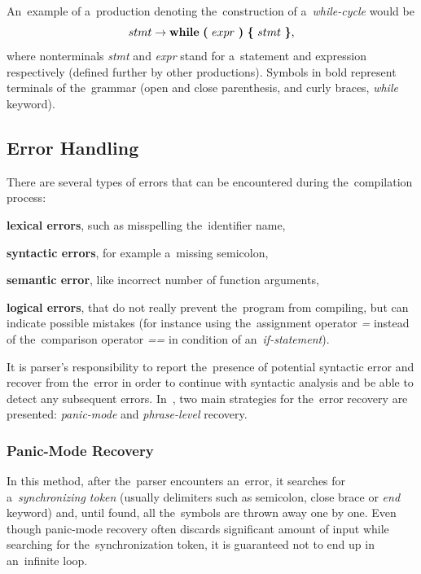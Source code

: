 \documentclass[
  digital, %
  table,   %
  lof,     %
  lot,     %
  oneside,
]{fithesis3}
\begin{document}
An~example of a~production denoting the~construction of a~\textit{while-cycle} would be
\begin{equation}
  stmt 
  \rightarrow 
  \textbf{while}\ 
  \textbf{(}\ expr\ \textbf{)}\ 
  \textbf{\{}\ stmt\ \textbf{\}} 
  \textnormal{,}
\end{equation}
\noindent
where nonterminals \textit{stmt} and \textit{expr} stand for a~statement and expression respectively (defined further by other productions). Symbols in bold represent terminals of the~grammar (open and close parenthesis, and curly braces, \textit{while} keyword).

\subsection{Error Handling}
There are several types of errors that can be encountered during the~compilation process:
\begin{compactitem}
  \item\textbf{lexical errors}, such as misspelling the~identifier name,
  \item\textbf{syntactic errors}, for example a~missing semicolon,
  \item\textbf{semantic error}, like incorrect number of function arguments,
  \item\textbf{logical errors}, that do not really prevent the~program from compiling, but can indicate possible mistakes (for instance using the~assignment operator \textit{=} instead of the~comparison operator \textit{==} in condition of an~\textit{if-statement}).
\end{compactitem} 

It is parser's responsibility to report the~presence of potential syntactic error and recover from the~error in order to continue with syntactic analysis and be able to detect any subsequent errors. In~\cite{principles-of-compilers}, two main strategies for the~error recovery are presented: \textit{panic-mode} and \textit{phrase-level} recovery.

\subsubsection{\textbf{Panic-Mode Recovery}}
In this method, after the~parser encounters an~error, it searches for a~\textit{synchronizing token} (usually delimiters such as semicolon, close brace or \textit{end} keyword) and, until found, all the~symbols are thrown away one by one. Even though panic-mode recovery often discards significant amount of input while searching for the~synchronization token, it is guaranteed not to end up in an~infinite loop.
\end{document}
